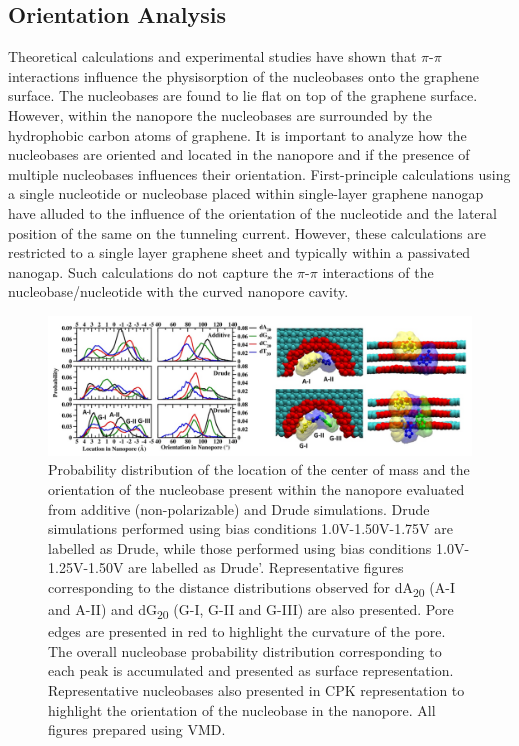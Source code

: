 \subsection[Orientation Analysis]{Orientation Analysis}
Theoretical calculations and experimental studies have shown that $\pi$-$\pi$ interactions influence the physisorption of the nucleobases onto the graphene surface.\supercite{varghese_binding_2009,umadevi_quantum_2011} The nucleobases are found to lie flat on top of the graphene surface. However, within the nanopore the nucleobases are surrounded by the hydrophobic carbon atoms of graphene. It is important to analyze how the nucleobases are oriented and located in the nanopore and if the presence of multiple nucleobases influences their orientation. First-principle calculations using a single nucleotide or nucleobase placed within single-layer graphene nanogap have alluded to the influence of the orientation of the nucleotide and the lateral position of the same on the tunneling current. However, these calculations are restricted to a single layer graphene sheet and typically within a passivated nanogap. Such calculations\supercite{prasongkit_transverse_2011} do not capture the $\pi$-$\pi$ interactions of the nucleobase/nucleotide with the curved nanopore cavity. 
\begin{figure}
    \centering
    \includegraphics[width=\textwidth]{Chapter4/Figures/Figure7.png}
    \caption[Probability distribution of the location of the center of mass and the orientation of the nucleobase present within the nanopore evaluated from additive (non-polarizable) and Drude simulations]{Probability distribution of the location of the center of mass and the orientation of the nucleobase present within the nanopore evaluated from additive (non-polarizable) and Drude simulations. Drude simulations performed using bias conditions 1.0V-1.50V-1.75V are labelled as Drude, while those performed using bias conditions 1.0V-1.25V-1.50V are labelled as Drude'. Representative figures corresponding to the distance distributions observed for dA\textsubscript{20} (A-I and A-II) and dG\textsubscript{20} (G-I, G-II and G-III) are also presented. Pore edges are presented in red to highlight the curvature of the pore. The overall nucleobase probability distribution corresponding to each peak is accumulated and presented as surface representation. Representative nucleobases also presented in CPK representation to highlight the orientation of the nucleobase in the nanopore. All figures prepared using VMD.\supercite{humphrey_vmd_1996}}
\end{figure}

